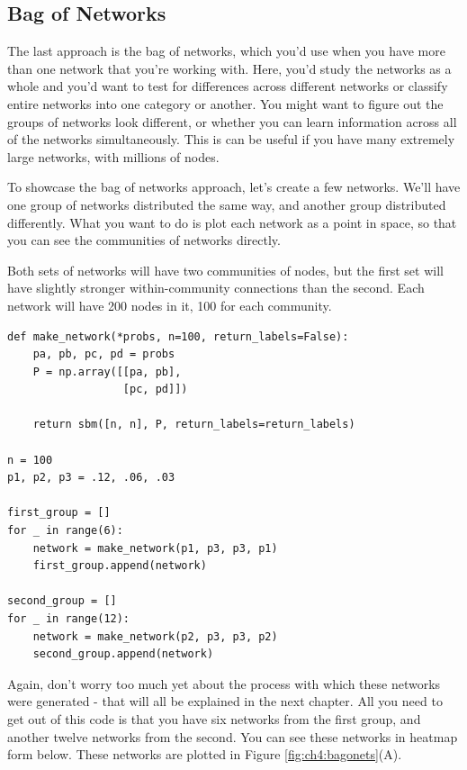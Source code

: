 \subsection{Bag of Networks}
\label{sec:ch4:net-rep:bagofnets}

The last approach is the bag of networks, which you'd use when you have more than one network that you're working with. Here, you'd study the networks as a whole and you'd want to test for differences across different networks or classify entire networks into one category or another. You might want to figure out the groups of networks look different, or whether you can learn information across all of the networks simultaneously. This is can be useful if you have many extremely large networks, with millions of nodes.

To showcase the bag of networks approach, let's create a few networks. We'll have one group of networks distributed the same way, and another group distributed differently. What you want to do is plot each network as a point in space, so that you can see the communities of networks directly.

Both sets of networks will have two communities of nodes, but the first set will have slightly stronger within-community connections than the second. Each network will have 200 nodes in it, 100 for each community.

\begin{lstlisting}[style=python]
def make_network(*probs, n=100, return_labels=False):
    pa, pb, pc, pd = probs
    P = np.array([[pa, pb], 
                  [pc, pd]])
    
    return sbm([n, n], P, return_labels=return_labels)

n = 100
p1, p2, p3 = .12, .06, .03

first_group = []
for _ in range(6):
    network = make_network(p1, p3, p3, p1)
    first_group.append(network)
    
second_group = []
for _ in range(12):
    network = make_network(p2, p3, p3, p2)
    second_group.append(network)
\end{lstlisting}

Again, don't worry too much yet about the process with which these networks were generated - that will all be explained in the next chapter. All you need to get out of this code is that you have six networks from the first group, and another twelve networks from the second. You can see these networks in heatmap form below. These networks are plotted in Figure \ref{fig:ch4:bagonets}(A). 

